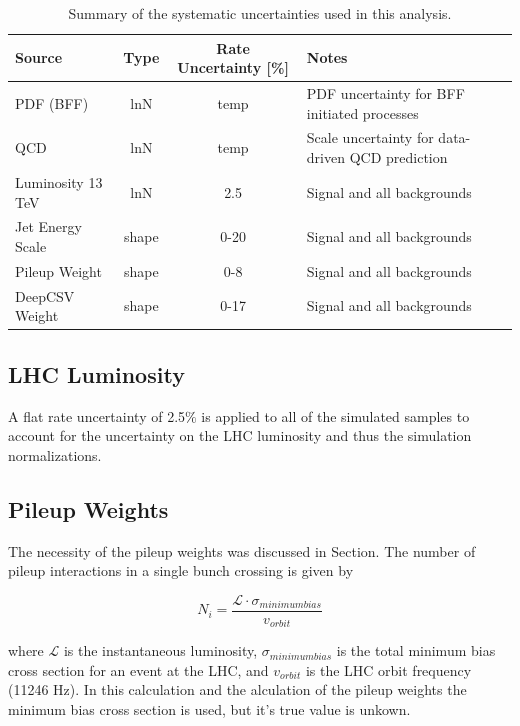 \begin{table}
	\centering
	\begin{tabular}{lccl}%
		\hline
		Source                                            & Type  & Rate Uncertainty [\%] & Notes \\
		\hline
		PDF (BFF)                                  & lnN   & temp         & PDF uncertainty for BFF initiated processes  \\
		\hline
		QCD                                               & lnN   & temp          & Scale uncertainty for data-driven QCD prediction \\
		\hline
		Luminosity 13 TeV                          & lnN   & 2.5         & Signal and all backgrounds \\
		Jet Energy Scale                                  & shape & 0-20        & Signal and all backgrounds \\
		Pileup Weight                                     & shape & 0-8         & Signal and all backgrounds \\
		DeepCSV Weight                                        & shape & 0-17        & Signal and all backgrounds \\
		\hline
	\end{tabular}
	\caption{Summary of the systematic uncertainties used in this analysis.}
	\label{tab:systematics_summary}
\end{table}

\subsection{LHC Luminosity}
A flat rate uncertainty of 2.5$\%$ is applied to all of the simulated samples to account for the uncertainty on the LHC luminosity and thus the simulation normalizations\cite{CMS-PAS-LUM-17-001}.
	 
\subsection{Pileup Weights}
The necessity of the pileup weights was discussed in Section. The number of pileup interactions in a single bunch crossing is given by
	 
\begin{equation}
N_{i} = \frac{\mathcal{L}\cdot \sigma_{minimum bias}}{v_{orbit}}
\end{equation}

where $\mathcal{L}$ is the instantaneous luminosity, $\sigma_{minimum bias}$ is the total minimum bias cross section for an event at the LHC, and $v_{orbit}$ is the LHC orbit frequency (11246 Hz). In this calculation and the alculation of the pileup weights the minimum bias cross section is used, but it's true value is unkown. 

